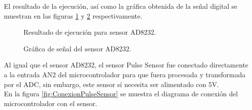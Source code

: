 El resultado de la ejecución, así como la gráfica obtenida de la señal digital se muestran en las figuras \ref{fig:TerminalAD8232} y \ref{fig:GraficaAD8232} respectivamente.

	\begin{figure}[htbp!]
		\centering
		\caption{Resultado de ejecución para sensor AD8232.}
		\label{fig:TerminalAD8232}
	\end{figure}
	
	\begin{figure}[htbp!]
		\centering
		\caption{Gráfica de señal del sensor AD8232.}
		\label{fig:GraficaAD8232}
	\end{figure}
	
Al igual que el sensor AD8232, el sensor Pulse Sensor fue conectado directamente a la entrada AN2 del microcontrolador para que fuera procesada y transformada por el ADC, sin embargo, este sensor sí necesita ser alimentado con 5V.\\

En la figura \ref{fig:ConexionPulseSensor} se muestra el diagrama de conexión del microcontrolador con el sensor.
	
